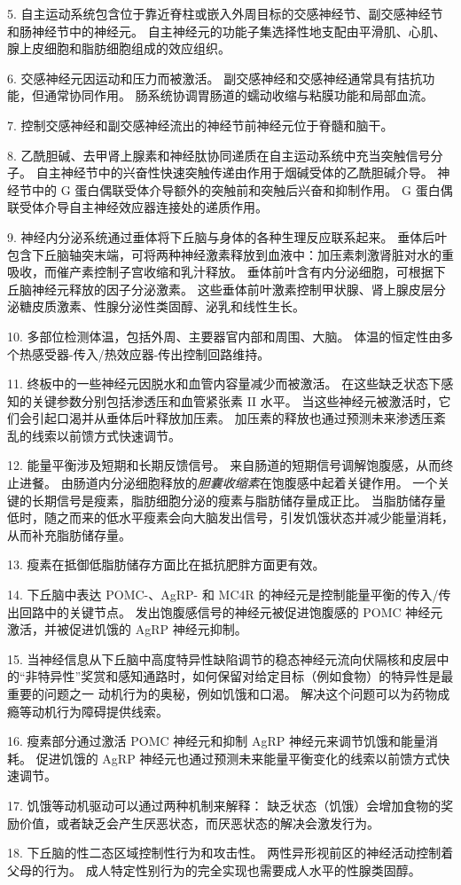 5. 自主运动系统包含位于靠近脊柱或嵌入外周目标的交感神经节、副交感神经节和肠神经节中的神经元。
自主神经元的功能子集选择性地支配由平滑肌、心肌、腺上皮细胞和脂肪细胞组成的效应组织。


6. 交感神经元因运动和压力而被激活。
副交感神经和交感神经通常具有拮抗功能，但通常协同作用。
肠系统协调胃肠道的蠕动收缩与粘膜功能和局部血流。


7. 控制交感神经和副交感神经流出的神经节前神经元位于脊髓和脑干。


8. 乙酰胆碱、去甲肾上腺素和神经肽协同递质在自主运动系统中充当突触信号分子。
自主神经节中的兴奋性快速突触传递由作用于烟碱受体的乙酰胆碱介导。
神经节中的 G 蛋白偶联受体介导额外的突触前和突触后兴奋和抑制作用。
G 蛋白偶联受体介导自主神经效应器连接处的递质作用。 


9. 神经内分泌系统通过垂体将下丘脑与身体的各种生理反应联系起来。
垂体后叶包含下丘脑轴突末端，可将两种神经激素释放到血液中：加压素刺激肾脏对水的重吸收，而催产素控制子宫收缩和乳汁释放。
垂体前叶含有内分泌细胞，可根据下丘脑神经元释放的因子分泌激素。
这些垂体前叶激素控制甲状腺、肾上腺皮层分泌糖皮质激素、性腺分泌性类固醇、泌乳和线性生长。


10. 多部位检测体温，包括外周、主要器官内部和周围、大脑。
体温的恒定性由多个热感受器-传入/热效应器-传出控制回路维持。


11. 终板中的一些神经元因脱水和血管内容量减少而被激活。
在这些缺乏状态下感知的关键参数分别包括渗透压和血管紧张素 II 水平。
当这些神经元被激活时，它们会引起口渴并从垂体后叶释放加压素。
加压素的释放也通过预测未来渗透压紊乱的线索以前馈方式快速调节。 


12. 能量平衡涉及短期和长期反馈信号。
来自肠道的短期信号调解饱腹感，从而终止进餐。
由肠道内分泌细胞释放的\textit{胆囊收缩素}在饱腹感中起着关键作用。
一个关键的长期信号是瘦素，脂肪细胞分泌的瘦素与脂肪储存量成正比。
当脂肪储存量低时，随之而来的低水平瘦素会向大脑发出信号，引发饥饿状态并减少能量消耗，从而补充脂肪储存量。 


13. 瘦素在抵御低脂肪储存方面比在抵抗肥胖方面更有效。 


14. 下丘脑中表达 POMC-、AgRP- 和 MC4R 的神经元是控制能量平衡的传入/传出回路中的关键节点。
发出饱腹感信号的神经元被促进饱腹感的 POMC 神经元激活，并被促进饥饿的 AgRP 神经元抑制。


15. 当神经信息从下丘脑中高度特异性缺陷调节的稳态神经元流向伏隔核和皮层中的“非特异性”奖赏和感知通路时，如何保留对给定目标（例如食物）的特异性是最重要的问题之一 动机行为的奥秘，例如饥饿和口渴。
解决这个问题可以为药物成瘾等动机行为障碍提供线索。 


16. 瘦素部分通过激活 POMC 神经元和抑制 AgRP 神经元来调节饥饿和能量消耗。
促进饥饿的 AgRP 神经元也通过预测未来能量平衡变化的线索以前馈方式快速调节。


17. 饥饿等动机驱动可以通过两种机制来解释：
缺乏状态（饥饿）会增加食物的奖励价值，或者缺乏会产生厌恶状态，而厌恶状态的解决会激发行为。 


18. 下丘脑的性二态区域控制性行为和攻击性。
两性异形视前区的神经活动控制着父母的行为。
成人特定性别行为的完全实现也需要成人水平的性腺类固醇。

